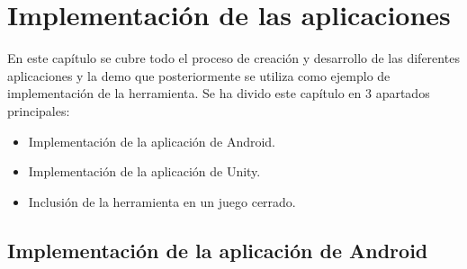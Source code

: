 %
%
%
%
%
%
%
%
%
%

\chapter{Implementaci\'on de las aplicaciones}
\label{cap4}
\label{cap:impl}

En este cap\'itulo se cubre todo el proceso de creaci\'on y desarrollo de las diferentes aplicaciones y la demo que posteriormente se utiliza como ejemplo de implementaci\'on de la herramienta.
Se ha divido este cap\'itulo en 3 apartados principales:

\begin {itemize}
\item Implementaci\'on de la aplicaci\'on de Android.
\item Implementaci\'on de la aplicaci\'on de Unity.
\item Inclusi\'on de la herramienta en un juego cerrado.
\end {itemize}

\section{Implementaci\'on de la aplicaci\'on de Android}

